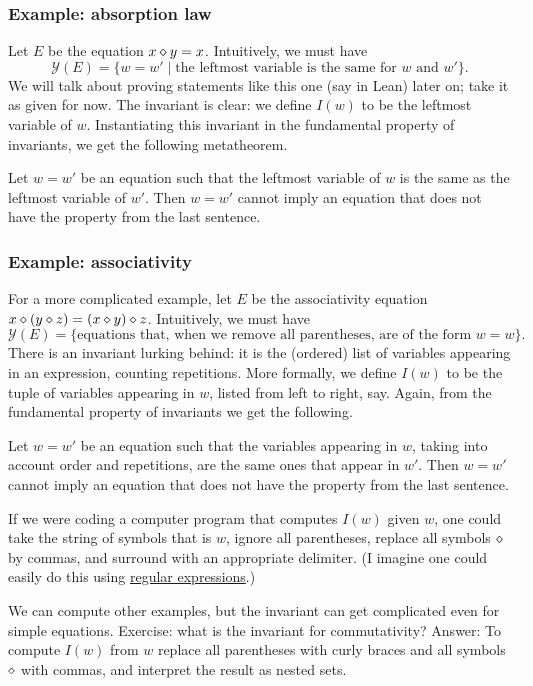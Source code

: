 \subsubsection*{Example: absorption law}
Let $E$ be the equation $x \diamond y = x$. Intuitively, we must have
\[
\mathcal{Y}(E) = \{w = w' \mid \text{the leftmost variable is the same for $w$ and $w'$}\}.
\]
We will talk about proving statements like this one (say in Lean) later on; take it as given for now. The invariant is clear: we define $I(w)$ to be the leftmost variable of $w$. Instantiating this invariant in the fundamental property of invariants, we get the following metatheorem.
\begin{metatheorem}
	Let $w = w'$ be an equation such that the leftmost variable of $w$ is the same as the leftmost variable of $w'$. Then $w = w'$ cannot imply an equation that does not have the property from the last sentence.
\end{metatheorem}

\subsubsection*{Example: associativity}
For a more complicated example, let $E$ be the associativity equation $x \diamond (y \diamond z) = (x \diamond y) \diamond z$. Intuitively, we must have
\[
\mathcal{Y}(E) = \{\text{equations that, when we remove all parentheses, are of the form $w = w$}\}.
\]
There is an invariant lurking behind: it is the (ordered) list of variables appearing in an expression, counting repetitions. More formally, we define $I(w)$ to be the tuple of variables appearing in $w$, listed from left to right, say. Again, from the fundamental property of invariants we get the following.
\begin{metatheorem}
	Let $w = w'$ be an equation such that the variables appearing in $w$, taking into account order and repetitions, are the same ones that appear in $w'$. Then $w = w'$ cannot imply an equation that does not have the property from the last sentence.
\end{metatheorem}

If we were coding a computer program that computes $I(w)$ given $w$, one could take the string of symbols that is $w$, ignore all parentheses, replace all symbols $\diamond$ by commas, and surround with an appropriate delimiter. (I imagine one could easily do this using \href{https://en.wikipedia.org/wiki/Regular_expression}{regular expressions}.)

We can compute other examples, but the invariant can get complicated even for simple equations. Exercise: what is the invariant for commutativity? Answer: To compute $I(w)$ from $w$ replace all parentheses with curly braces and all symbols $\diamond$ with commas, and interpret the result as nested sets.

